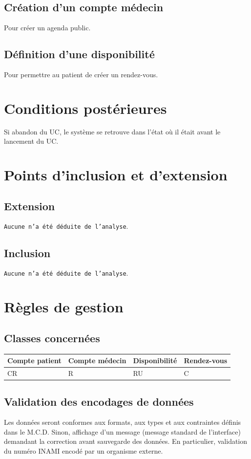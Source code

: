 \documentclass[a4paper, 11pt]{report}
\begin{document}
\subsection{Création d'un compte médecin}
Pour créer un agenda public.
\subsection{Définition d'une disponibilité}
Pour permettre au patient de créer un rendez-vous.

\section{Conditions postérieures}
Si abandon du UC, le système se retrouve dans l’état où il était avant le
lancement du UC.
\newpage

\section{Points d'inclusion et d'extension}
\subsection{Extension}
\texttt{Aucune n'a été déduite de l'analyse}.
\subsection{Inclusion}
\texttt{Aucune n'a été déduite de l'analyse}.
\newpage

\section{Règles de gestion}
\subsection{Classes concernées}
\begin{center}
	\begin{longtable}{|p{2.2cm}|p{2.2cm}|p{2.2cm}|p{2.2cm}|}
		\hline
		 Compte patient & Compte médecin & Disponibilité & Rendez-vous \\
		\hline
		 CR & R & RU & C \\
		\hline
	\end{longtable}
\end{center}
\subsection{Validation des encodages de données}
Les données seront conformes aux formats, aux types et aux contraintes définis
dans le M.C.D. Sinon, affichage d’un message (message standard de l’interface) 
demandant la correction avant sauvegarde des données.
En particulier, validation du numéro INAMI encodé par un organisme externe.
\end{document}
